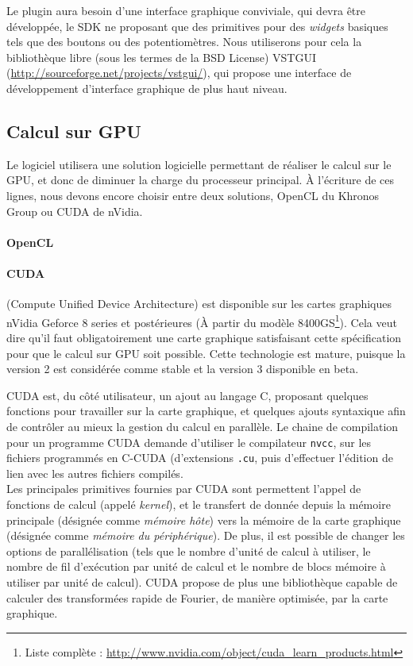 Le plugin aura besoin d'une interface graphique conviviale, qui devra être développée, le SDK ne proposant que des primitives pour des \emph{widgets} basiques tels que des boutons ou des potentiomètres. Nous utiliserons pour cela la bibliothèque libre (sous les termes de la BSD License) VSTGUI (\url{http://sourceforge.net/projects/vstgui/}), qui propose une interface de développement d'interface graphique de plus haut niveau.
\subsection{Calcul sur GPU}
Le logiciel utilisera une solution logicielle permettant de réaliser le calcul sur le GPU, et donc de diminuer la charge du processeur principal.
À l'écriture de ces lignes, nous devons encore choisir entre deux solutions, OpenCL du Khronos Group ou CUDA de nVidia.
\paragraph{OpenCL}

\paragraph{CUDA}
(Compute Unified Device Architecture) est disponible sur les cartes graphiques nVidia Geforce 8 series  et postérieures (À partir du modèle 8400GS\footnote{Liste complète : \url{http://www.nvidia.com/object/cuda\_learn\_products.html}}). Cela veut dire qu'il faut obligatoirement une carte graphique satisfaisant cette spécification pour que le calcul sur GPU soit possible. Cette technologie est mature, puisque la version 2 est considérée comme stable et la version 3 disponible en beta.

CUDA est, du côté utilisateur, un ajout au langage C, proposant quelques fonctions pour travailler sur la carte graphique, et quelques ajouts syntaxique afin de contrôler au mieux la gestion du calcul en parallèle. Le chaine de compilation pour un programme CUDA demande d'utiliser le compilateur {\tt nvcc}, sur les fichiers programmés en C-CUDA (d'extensions {\tt .cu}, puis d'effectuer l'édition de lien avec les autres fichiers compilés.\\

Les principales primitives fournies par CUDA sont permettent l'appel de fonctions de calcul (appelé \emph{kernel}), et le transfert de donnée depuis la mémoire principale (désignée comme \emph{mémoire hôte}) vers la mémoire de la carte graphique (désignée comme \emph{mémoire du périphérique}). De plus, il est possible de changer les options de parallélisation (tels que le nombre d'unité de calcul à utiliser, le nombre de fil d'exécution par unité de calcul et le nombre de blocs mémoire à utiliser par unité de calcul).
CUDA propose de plus une bibliothèque capable de calculer des transformées rapide de Fourier, de manière optimisée, par la carte graphique.

